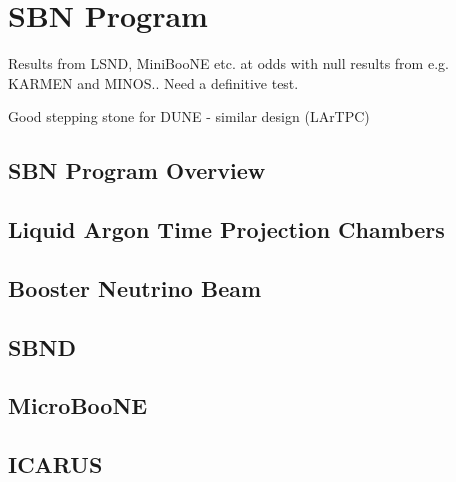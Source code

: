 \chapter{SBN Program}
\label{chap:SBN Program}
Results from LSND, MiniBooNE etc. at odds with null results from e.g. KARMEN and MINOS.. Need a definitive test.

Good stepping stone for DUNE - similar design (LArTPC)


\section{SBN Program Overview}
\section{Liquid Argon Time Projection Chambers}
\section{Booster Neutrino Beam}
\section{SBND}
\section{MicroBooNE}
\section{ICARUS}